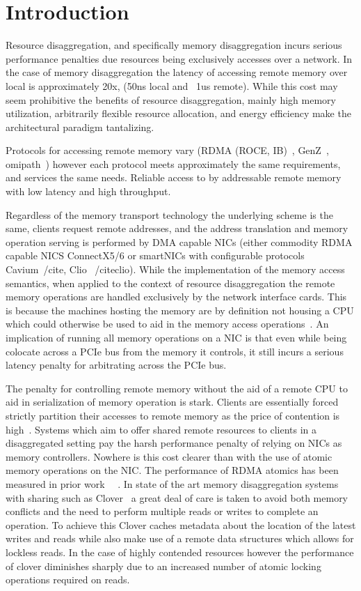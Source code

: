 \section{Introduction}

Resource disaggregation, and specifically memory disaggregation incurs serious
performance penalties due resources being exclusively accesses over a network. In
the case of memory disaggregation the latency of accessing remote memory over
local is approximately 20x, (50ns local and ~1us remote). While this cost may
seem prohibitive the benefits of resource disaggregation, mainly high memory
utilization, arbitrarily flexible resource allocation, and energy efficiency make
the architectural paradigm tantalizing.

Protocols for accessing remote memory vary (RDMA (ROCE, IB)~\cite{},
GenZ~\cite{}, omipath~\cite{}) however each protocol meets approximately the same
requirements, and services the same needs. Reliable access to by addressable
remote memory with low latency and high throughput.

Regardless of the memory transport technology the underlying scheme is the
same, clients request remote addresses, and the address translation and memory
operation serving is performed by DMA capable NICs (either commodity RDMA capable
NICS ConnectX5/6 or smartNICs with configurable protocols Cavium~/cite{}, Clio
~/cite{clio}). While the implementation of the memory access semantics, when
applied to the context of resource disaggregation the remote memory operations
are handled exclusively by the network interface cards. This is because the
machines hosting the memory are by definition not housing a CPU which could
otherwise be used to aid in the memory access operations~\cite{HERD,SoNUMA,
STORM, (every KV store), RMA-paper}. An implication of running all memory
operations on a NIC is that even while being colocate across a PCIe bus from
the memory it controls, it still incurs a serious latency penalty for
arbitrating across the PCIe bus.

The penalty for controlling remote memory without the aid of a remote CPU to aid
in serialization of memory operation is stark. Clients are essentially forced
strictly partition their accesses to remote memory as the price of contention is
high~\cite{LegoOS, Remote Regions}. Systems which aim to offer shared remote
resources to clients in a disaggregated setting pay the harsh performance
penalty of relying on NICs as memory controllers. Nowhere is this cost clearer
than with the use of atomic memory operations on the NIC. The performance of
RDMA atomics has been measured in prior work ~\cite{requirements for
RDMA}~\cite{Clover}. In state of the art memory disaggregation systems with
sharing such as Clover~\cite{clover} a great deal of care is taken to avoid both
memory conflicts and the need to perform multiple reads or writes to complete an
operation. To achieve this Clover caches metadata about the location of the
latest writes and reads while also make use of a remote data structures which
allows for lockless reads. In the case of highly contended resources however the
performance of clover diminishes sharply due to an increased number of atomic
locking operations required on reads.

